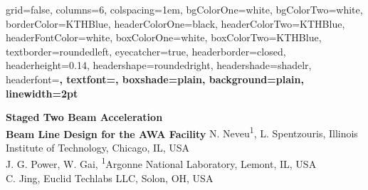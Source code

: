 \documentclass[portrait,final,paperwidth=120cm, paperheight=240cm,  fontscale=0.277]{baposter}
\begin{document}
\begin{poster}{
	grid=false,
	columns=6,
	colspacing=1em,
	bgColorOne=white,
	bgColorTwo=white,
	borderColor=KTHBlue,
	headerColorOne=black,
	headerColorTwo=KTHBlue,
	headerFontColor=white,
	boxColorOne=white,
	boxColorTwo=KTHBlue,
	textborder=roundedleft,
	eyecatcher=true,
	headerborder=closed,
	headerheight=0.14\textheight,
	headershape=roundedright,
	headershade=shadelr,
	headerfont=\Large\bf\textsc, %
	textfont={\setlength{\parindent}{0em}},
	boxshade=plain,
	background=plain,
	linewidth=2pt
}
{
	
	 }
{\bf{Staged Two Beam Acceleration \\Beam Line Design for the AWA Facility}}%
{\vspace{1em}
	N. Neveu\textsuperscript{1}, L. Spentzouris, Illinois Institute of Technology, Chicago, IL, USA \\
	J. G. Power, W. Gai, \textsuperscript{1}Argonne National  Laboratory, Lemont, IL, USA \\
	C. Jing, Euclid Techlabs LLC, Solon, OH, USA \\
    }
{%

}




\end{poster}
\end{document}
